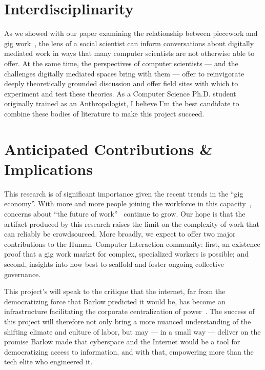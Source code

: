 \documentclass{article}
\newcommand{\topic}[1]{{\color{Blue}#1}}
\renewcommand{\topic}[1]{{#1}}
\begin{document}
\section*{Interdisciplinarity}
As we showed with our paper examining the relationship between piecework and gig work~\cite{pieceworkCrowdworkGigwork},
the lens of a social scientist can inform conversations about digitally mediated work in ways that many computer scientists are not otherwise able to offer.
At the same time, the perspectives of computer scientists
--- and the challenges digitally mediated spaces bring with them ---
offer to reinvigorate deeply theoretically grounded discussion and offer field sites with which to experiment and test these theories.
As a Computer Science Ph.D. student originally trained as an Anthropologist, I believe
I'm the best candidate to combine these bodies of literature to make this project succeed.










\section*{Anticipated Contributions \& Implications}
This research is of significant importance given the recent trends in the ``gig economy''.
With more and more people joining the workforce in this capacity~\cite{pewSharing,pewSharing24percent},
concerns about ``the future of work''~\cite{waterCooler,crowdworkFuture} continue to grow.
Our hope is that the artifact produced by this research raises the limit on the complexity of work that can reliably be crowdsourced.
More broadly, we expect to offer two major contributions to the Human--Computer Interaction community:
first, an existence proof that a gig work market for complex, specialized workers is possible; and
second, insights into how best to scaffold and foster ongoing collective governance.

This project's will speak to the critique that the internet,
far from the democratizing force that Barlow predicted it would be,
has become an infrastructure facilitating the corporate centralization of power~\cite{barlow2009declaration,jones2011does,EboCybertopia}.
The success of this project will therefore not only
bring a more nuanced understanding of the shifting climate and culture of labor,
but may
--- in a small way ---
deliver on the promise Barlow made that
cyberspace and the Internet would be a tool for democratizing access to information, and with that,
empowering more than the tech elite who engineered it.

\pagebreak
\printbibliography{}
\end{document}
